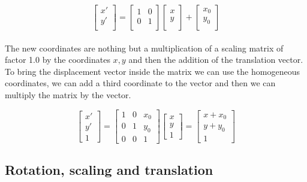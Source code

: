 \[
    \begin{bmatrix}
        x' \\
        y' \\
        \end{bmatrix}
        =
        \begin{bmatrix}
        1 & 0  \\
        0 & 1  \\
        \end{bmatrix}
        \begin{bmatrix}
        x \\
        y \\
        \end{bmatrix}
        +
        \begin{bmatrix}
            x_0 \\
            y_0 \\
        \end{bmatrix}
\]
\\
The new coordinates are nothing but a multiplication of a scaling matrix of factor 1.0 by the coordinates \(x, y\) and then the addition of the translation vector.
\\
To bring the displacement vector inside the matrix we can use the homogeneous coordinates, we can add a third coordinate to the vector and then we can multiply the matrix by the vector.

\[
    \begin{bmatrix}
        x' \\
        y' \\
        1
        \end{bmatrix}
        =
        \begin{bmatrix}
        1 & 0 & x_0 \\
        0 & 1 & y_0 \\
        0 & 0 & 1
        \end{bmatrix}
        \begin{bmatrix}
        x \\
        y \\
        1
        \end{bmatrix}
        =
        \begin{bmatrix}
        x + x_0 \\
        y + y_0 \\
        1
        \end{bmatrix}
\]


\subsection{Rotation, scaling and translation}

